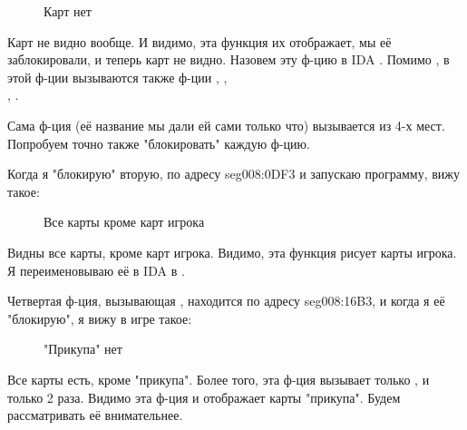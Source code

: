 \begin{figure}[H]
\centering
{}
\caption{Карт нет}
\end{figure}

Карт не видно вообще. И видимо, эта функция их отображает, мы её заблокировали, и теперь карт не видно.
Назовем эту ф-цию в IDA .
Помимо , в этой ф-ции вызываются также ф-ции , 
, \\
, .

Сама ф-ция  (её название мы дали ей сами только что) вызывается из 4-х мест.
Попробуем точно также "блокировать" каждую ф-цию.

Когда я "блокирую" вторую, по адресу seg008:0DF3 и запускаю программу, вижу такое:

\begin{figure}[H]
\centering
{}
\caption{Все карты кроме карт игрока}
\end{figure}

Видны все карты, кроме карт игрока. Видимо, эта функция рисует карты игрока. \\
Я переименовываю её в IDA в .

Четвертая ф-ция, вызывающая , находится по адресу seg008:16B3, и когда я её "блокирую",
я вижу в игре такое:

\begin{figure}[H]
\centering
{}
\caption{"Прикупа" нет}
\end{figure}

Все карты есть, кроме "прикупа". Более того, эта ф-ция вызывает только , и только 2 раза.
Видимо эта ф-ция и отображает карты "прикупа".
Будем рассматривать её внимательнее.

